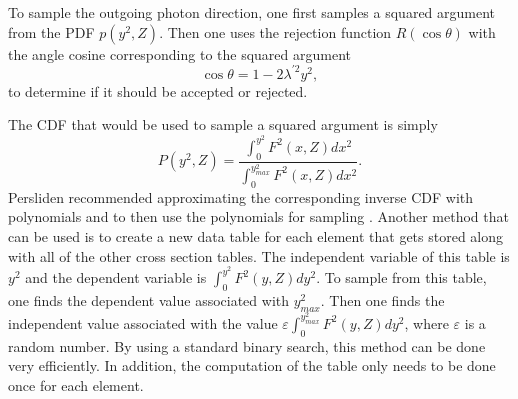 To sample the outgoing photon direction, one first samples a squared
argument from the PDF $p(y^2,Z)$. Then one uses the rejection function 
$R(\cos{\theta})$ with the angle cosine corresponding to the squared argument
\begin{equation}
  \cos{\theta} = 1 - 2\lambda^{'2}y^2,
\end{equation}
to determine if it should be accepted or rejected.

The CDF that would be used to sample a squared argument is simply
\begin{equation}
  P(y^2,Z) = \frac{\int_0^{y^2}F^2(x,Z)dx^2}{\int_0^{y_{max}^2}F^2(x,Z)dx^2}.
\end{equation}
Persliden recommended approximating the corresponding inverse CDF with 
polynomials and to then use the polynomials for sampling 
\citep{persliden_monte_1983}. Another method that can be used is to create a 
new data table for each element that gets stored along with all of the other 
cross section tables. The independent variable of this table is $y^2$ and the
dependent variable is $\int_0^{y^2}F^2(y,Z)dy^2$. To sample from this table, one
finds the dependent value associated with $y_{max}^2$. Then one finds the 
independent value associated with the value 
$\varepsilon \int_0^{y_{max}^2}F^2(y,Z)dy^2$, where $\varepsilon$ is a random 
number. By using a standard binary search, this method can be done very 
efficiently. In addition, the computation of the table only needs to be done 
once for each element.

